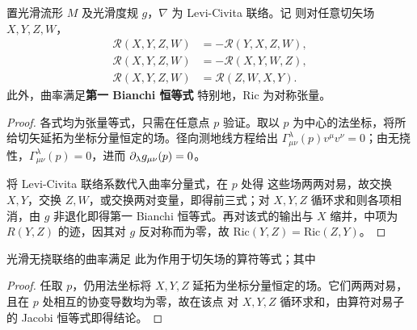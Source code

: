 \begin{theorem}[曲率的对称性]
    置光滑流形 $M$ 及光滑度规 $g$，$\nabla$ 为 Levi-Civita 联络。记
    则对任意切矢场 $X,Y,Z,W$，
    \begin{align*}
        \mathcal R(X,Y,Z,W)&=-\mathcal R(Y,X,Z,W),\\
        \mathcal R(X,Y,Z,W)&=-\mathcal R(X,Y,W,Z),\\
        \mathcal R(X,Y,Z,W)&=\mathcal R(Z,W,X,Y).
    \end{align*}
    此外，曲率满足\textbf{第一 Bianchi 恒等式}
    特别地，$\mathrm{Ric}$ 为对称张量。
\end{theorem}
\begin{proof}
    各式均为张量等式，只需在任意点 $p$ 验证。取以 $p$ 为中心的法坐标，将所给切矢延拓为坐标分量恒定的场。径向测地线方程给出 $\Gamma^\lambda_{\mu\nu}(p)v^\mu v^\nu=0$；由无挠性，$\Gamma^\lambda_{\mu\nu}(p)=0$，进而 $\partial_\lambda g_{\mu\nu}(p)=0$。

    将 Levi-Civita 联络系数代入曲率分量式，在 $p$ 处得
    这些场两两对易，故交换 $X,Y$，交换 $Z,W$，或交换两对变量，即得前三式；对 $X,Y,Z$ 循环求和则各项相消，由 $g$ 非退化即得第一 Bianchi 恒等式。再对该式的输出与 $X$ 缩并，中项为 $R(Y,Z)$ 的迹，因其对 $g$ 反对称而为零，故 $\mathrm{Ric}(Y,Z)=\mathrm{Ric}(Z,Y)$。
\end{proof}

\begin{theorem}
    光滑无挠联络的曲率满足
    此为作用于切矢场的算符等式；其中
\end{theorem}
\begin{proof}
    任取 $p$，仍用法坐标将 $X,Y,Z$ 延拓为坐标分量恒定的场。它们两两对易，且在 $p$ 处相互的协变导数均为零，故在该点
    对 $X,Y,Z$ 循环求和，由算符对易子的 Jacobi 恒等式即得结论。
\end{proof}

